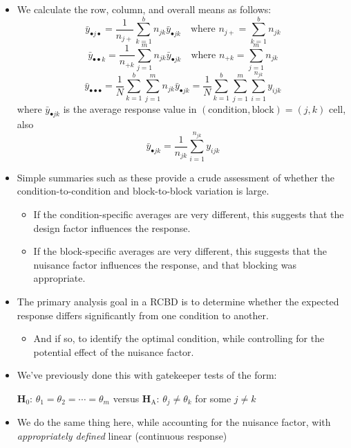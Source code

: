 \begin{itemize}
\begin{itemize}
            \end{itemize}
      \item We calculate the row, column, and overall means as follows:
            \[ \bar{y}_{\bullet j\bullet}=\frac{1}{n_{j+}} \sum_{k=1}^{b} n_{jk}\bar{y}_{\bullet jk}\quad\text{where }n_{j+}=\sum_{k=1}^{b} n_{jk} \]
            \[ \bar{y}_{\bullet\bullet k}=\frac{1}{n_{+k}} \sum_{j=1}^{m} n_{jk}\bar{y}_{\bullet jk}\quad\text{where }n_{+k}=\sum_{j=1}^{m} n_{jk} \]
            \[ \bar{y}_{\bullet\bullet\bullet}=\frac{1}{N} \sum_{k=1}^{b} \sum_{j=1}^{m} n_{jk}\bar{y}_{\bullet jk}=\frac{1}{N} \sum_{k=1}^{b} \sum_{j=1}^{m} \sum_{i=1}^{n_{jk}} y_{ijk} \]
            where $ \bar{y}_{\bullet jk} $ is the average response value in $  (\text{condition}, \text{block}) = (j, k) $ cell, also
            \[ \bar{y}_{\bullet jk}=\frac{1}{n_{jk}} \sum_{i=1}^{n_{jk}} y_{ijk} \]
      \item Simple summaries such as these provide a crude assessment of whether the condition-to-condition and
            block-to-block variation is large.
            \begin{itemize}
                  \item If the condition-specific averages are very different, this suggests that the design factor influences the response.
                  \item If the block-specific averages are very different, this suggests that the nuisance factor influences the response, and that blocking was appropriate.
            \end{itemize}
      \item The primary analysis goal in a RCBD is to determine whether the expected response differs significantly
            from one condition to another.
            \begin{itemize}
                  \item And if so, to identify the optimal condition, while controlling for the potential effect of the nuisance factor.
            \end{itemize}
      \item We've previously done this with gatekeeper tests of the form:
            \begin{tightcenter}
                  $ \mathbf{H}_0 $: $ \theta_1=\theta_2=\cdots=\theta_m $ versus $ \mathbf{H}_\text{A} $: $ \theta_j\ne \theta_k $ for some $ j\ne k $
            \end{tightcenter}
      \item We do the same thing here, while accounting for the nuisance factor, with \emph{appropriately defined} linear (continuous response)

\end{itemize}
